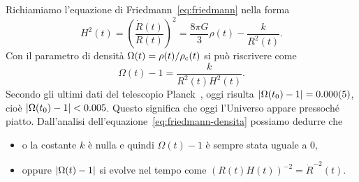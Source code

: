 Richiamiamo l'equazione di Friedmann~\eqref{eq:friedmann} nella forma
\begin{equation}
  \label{eq:friedmann2}
  H^{2}(t) = \left(\frac{\dot{R}(t)}{R(t)}\right)^{2} = \frac{8\pi G}{3}\rho(t)
  - \frac{k}{R^{2}(t)}.
\end{equation}
Con il parametro di densità \(\Omega(t) = \rho(t)/\rho_{\textup{c}}(t)\) si può
riscrivere come
\begin{equation}
  \label{eq:friedmann-densita}
  \Omega(t) - 1 = \frac{k}{R^{2}(t)H^{2}(t)}.
\end{equation}
Secondo gli ultimi dati del telescopio Planck~\parencite{2015arXiv150201589P},
oggi risulta \(\abs{\Omega(t_{0}) - 1} = \num{0.000(5)}\), cioè
\(\abs{\Omega(t_{0}) - 1} < \num{0.005}\).  Questo significa che oggi l'Universo
appare pressoché piatto.  Dall'analisi
dell'equazione~\eqref{eq:friedmann-densita} possiamo dedurre che
\begin{itemize}
\item o la costante \(k\) è nulla e quindi \(\Omega(t) - 1\) è sempre stata
  uguale a \(0\),
\item oppure \(\abs{\Omega(t) - 1}\) si evolve nel tempo come \((R(t)H(t))^{-2}
  = \dot{R}^{-2}(t)\).
\end{itemize}

